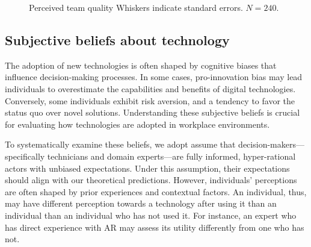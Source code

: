 \documentclass[msom,nonblindrev]{01 latex/class/informs3}
\begin{document}
\begin{figure}[htbp]
{Perceived team quality\label{fig:team.quality}}
{Whiskers indicate standard errors. $N = 240.$}
\end{figure}

\subsection{Subjective beliefs about technology}
The adoption of new technologies is often shaped by cognitive biases that influence decision-making processes. In some cases, pro-innovation bias may lead individuals to overestimate the capabilities and benefits of digital technologies. Conversely, some individuals exhibit risk aversion,  and a tendency to favor the status quo over novel solutions. Understanding these subjective beliefs is crucial for evaluating how technologies are adopted in workplace environments.

To systematically examine these beliefs, we adopt assume that decision-makers—specifically technicians and domain experts—are fully informed, hyper-rational actors with unbiased expectations. Under this assumption, their expectations should align with our theoretical predictions. However, individuals' perceptions are often shaped by prior experiences and contextual factors. An individual, thus, may have different perception towards a technology after using it than an individual than an individual who has not used it. For instance, an expert who has direct experience with AR may assess its utility differently from one who has not.
\end{document}
